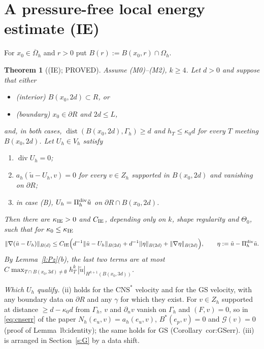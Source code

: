 \documentclass[11pt,reqno]{amsart}
\theoremstyle{plain}
\newtheorem{theorem}{Theorem}[section]
\theoremstyle{definition}
\newcommand{\Gh}{\Gamma_h}
\newcommand{\Oh}{\Omega_h}
\newcommand{\Vh}{V_h}
\newcommand{\Zh}{Z_h}
\newcommand{\dn}{\partial_n}
\newcommand{\ut}{\tilde u}
\newcommand{\norm}[1]{\lVert #1\rVert}
\newcommand{\GS}{\mathrm{GS}}
\newcommand{\CNS}{\mathrm{CNS}^\ast}
\renewcommand{\div}{\operatorname{div}}
\newcommand{\Gc}{\mathcal G}
\DeclareMathOperator{\dist}{dist}
\newcommand{\Pz}{\Pi^{\rm div}_h}   %
\begin{document}
\section{A pressure-free local energy estimate (IE)}\label{s:IE}

For $x_0\in\overline\Oh$ and $r>0$ put $B(r):=B(x_0,r)\cap\Oh$.

\begin{theorem}[(IE); PROVED]\label{t:IE}
Assume (M0)--(M2), $k\ge4$. Let $d>0$ and suppose that either
\begin{itemize}
\item[(I)] (interior) $B(x_0,2d)\subset R$, or
\item[(B)] (boundary) $x_0\in\partial R$ and $2d\le L$,
\end{itemize}
and, in both cases, $\dist(B(x_0,2d),\Gh)\ge d$ and $h_T\le\kappa_0d$ for every $T$ meeting $B(x_0,2d)$. Let $U_h\in\Vh$ satisfy
\begin{enumerate}[label=(\roman*)]
\item $\div U_h=0$;
\item $a_h(\ut-U_h,v)=0$ for every $v\in\Zh$ supported in $B(x_0,2d)$ and vanishing on $\partial R$;
\item in case (B), $U_h=\Pz\ut$ on $\partial R\cap B(x_0,2d)$.
\end{enumerate}
Then there are $\kappa_{\rm IE}>0$ and $C_{\rm IE}$, depending only on $k$, shape regularity and $\Theta_0$, such that for $\kappa_0\le\kappa_{\rm IE}$
\[
\norm{\nabla(\ut-U_h)}_{B(d)}\le C_{\rm IE}\Bigl(d^{-1}\norm{\ut-U_h}_{B(2d)}+d^{-1}\norm{\eta}_{B(2d)}+\norm{\nabla\eta}_{B(2d)}\Bigr),\qquad \eta:=\ut-\Pz\ut .
\]
By Lemma~\ref{l:Pz}(b), the last two terms are at most $C\max_{T\cap B(x_0,3d)\ne\emptyset}h_T^k\,|\ut|_{H^{k+1}(B(x_0,3d))}$.
\end{theorem}

\noindent\emph{Which $U_h$ qualify.} (ii) holds for the $\CNS$ velocity and for the $\GS$ velocity, with any boundary data on $\partial R$ and any $\gamma$ for which they exist. For $v\in\Zh$ supported at distance $\ge d-\kappa_0d$ from $\Gh$, $v$ and $\dn v$ vanish on $\Gh$ and $(F,v)=0$, so in \eqref{eq:cnserr} of the paper $N_h(e_u,v)=a_h(e_u,v)$, $B^\ast(e_p,v)=0$ and $\Gc(v)=0$ (proof of Lemma~lb:identity); the same holds for $\GS$ (Corollary~cor:GSerr). (iii) is arranged in Section~\ref{s:G} by a data shift.
\end{document}
